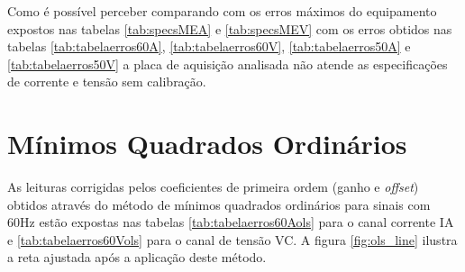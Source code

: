 \begin{table}[H]
\end{table}

Como é possível perceber comparando com os erros máximos do equipamento expostos nas tabelas \ref{tab:specsMEA} e \ref{tab:specsMEV} com os erros obtidos nas tabelas \ref{tab:tabelaerros60A}, \ref{tab:tabelaerros60V}, \ref{tab:tabelaerros50A} e \ref{tab:tabelaerros50V} a placa de aquisição analisada não atende as especificações de corrente e tensão sem calibração.

\newpage

\section{Mínimos Quadrados Ordinários}

As leituras corrigidas pelos coeficientes de primeira ordem (ganho e \textit{offset}) obtidos através do método de mínimos quadrados ordinários para sinais com 60Hz estão expostas nas tabelas \ref{tab:tabelaerros60Aols} para o canal corrente IA e \ref{tab:tabelaerros60Vols} para o canal de tensão VC. A figura \ref{fig:ols_line} ilustra a reta ajustada após a aplicação deste método.


